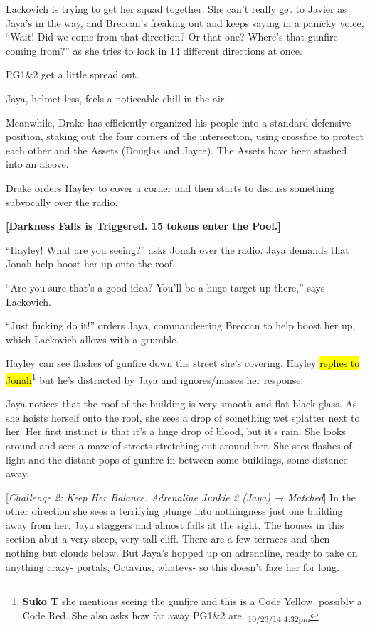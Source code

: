 Lackovich is trying to get her squad together.  She can't really get to Javier as Jaya's in the way, and Breccan's freaking out and keeps saying in a panicky voice, ``Wait!  Did we come from that direction?  Or that one?  Where's that gunfire coming from?'' as she tries to look in 14 different directions at once.

PG1\&2 get a little spread out.

Jaya, helmet-less, feels a noticeable chill in the air.



Meanwhile, Drake has efficiently organized his people into a standard defensive position, staking out the four corners of the intersection, using crossfire to protect each other and the Assets (Douglas and Jayce).  The Assets have been stashed into an alcove.

Drake orders Hayley to cover a corner and then starts to discuss something subvocally over the radio.



\textbf{{[}Darkness Falls is Triggered.  15 tokens enter the Pool.{]}}



``Hayley! What are you seeing?'' asks Jonah over the radio.  Jaya demands that Jonah help boost her up onto the roof.  

``Are you sure that's a good idea?  You'll be a huge target up there,'' says Lackovich.

``Just fucking do it!'' orders Jaya, commandeering Breccan to help boost her up, which Lackovich allows with a grumble.  



Hayley can see flashes of gunfire down the street she's covering.  Hayley \hl{replies to Jonah}\footnote{\textbf{Suko T }she mentions seeing the gunfire and this is a Code Yellow, possibly a Code Red.  She also asks how far away PG1\&2 are. \textsubscript{10/23/14 4:32pm}} but he's distracted by Jaya and ignores/misses her response.



Jaya notices that the roof of the building is very smooth and flat black glass.  As she hoists herself onto the roof, she sees a drop of something wet splatter next to her.  Her first instinct is that it's a huge drop of blood, but it's rain. She looks around and sees a maze of streets stretching out around her. She sees flashes of light and the distant pops of gunfire in between some buildings, some distance away.

{[}\textit{Challenge 2: Keep Her Balance.  Adrenaline Junkie 2 (Jaya) → Matched}{]}  In the other direction she sees a terrifying plunge into nothingness just one building away from her.  Jaya staggers and almost falls at the sight.  The houses in this section abut a very steep, very tall cliff.  There are a few terraces and then nothing but clouds below.  But Jaya's hopped up on adrenaline, ready to take on anything crazy- portals, Octavius, whatevs- so this doesn't faze her for long.



